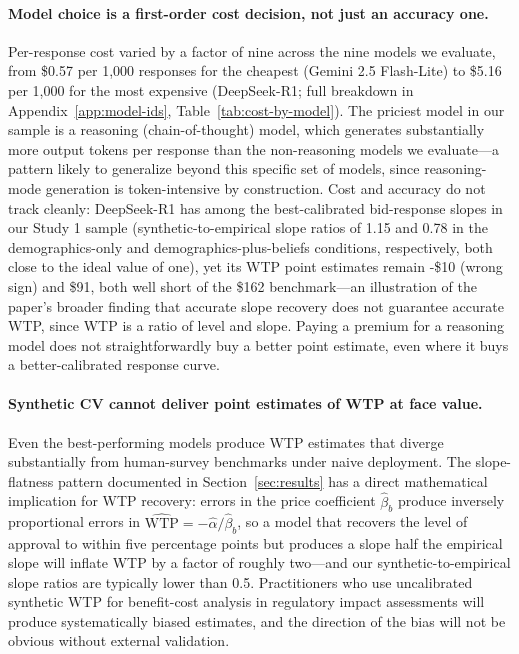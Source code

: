 \documentclass[12pt]{article}
\begin{document}
\paragraph{Model choice is a first-order cost decision, not just an
accuracy one.} Per-response cost varied by a factor of nine across the
nine models we evaluate, from \$0.57 per 1{,}000 responses for the
cheapest (Gemini 2.5 Flash-Lite) to \$5.16 per 1{,}000 for the most
expensive (DeepSeek-R1; full breakdown in
Appendix~\ref{app:model-ids}, Table~\ref{tab:cost-by-model}). The
priciest model in our sample is a reasoning (chain-of-thought) model,
which generates substantially more output tokens per response than the
non-reasoning models we evaluate---a pattern likely to generalize beyond
this specific set of models, since reasoning-mode generation is
token-intensive by construction. Cost and accuracy do not track cleanly:
DeepSeek-R1 has among the best-calibrated bid-response slopes in our
Study 1 sample (synthetic-to-empirical slope ratios of 1.15 and 0.78 in
the demographics-only and demographics-plus-beliefs conditions,
respectively, both close to the ideal value of one), yet its WTP point
estimates remain -\$10 (wrong sign) and \$91, both well short of the
\$162 benchmark---an illustration of the paper's broader finding that
accurate slope recovery does not guarantee accurate WTP, since WTP is a
ratio of level and slope. Paying a premium for a reasoning model does not
straightforwardly buy a better point estimate, even where it buys a
better-calibrated response curve.

\paragraph{Synthetic CV cannot deliver point estimates of WTP at face
value.} Even the best-performing models produce WTP estimates that
diverge substantially from human-survey benchmarks under naive
deployment. The slope-flatness pattern documented in
Section~\ref{sec:results} has a direct mathematical implication for WTP
recovery: errors in the price coefficient $\hat{\beta}_b$ produce
inversely proportional errors in $\widehat{\text{WTP}} =
-\hat{\alpha}/\hat{\beta}_b$, so a model that recovers the level of
approval to within five percentage points but produces a slope half the
empirical slope will inflate WTP by a factor of roughly two---and our
synthetic-to-empirical slope ratios are typically lower than 0.5.
Practitioners who use uncalibrated synthetic WTP for benefit-cost
analysis in regulatory impact assessments will produce systematically
biased estimates, and the direction of the bias will not be obvious
without external validation.
\end{document}
